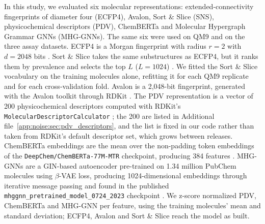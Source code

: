 In this study, we evaluated six molecular representations: extended-connectivity fingerprints of diameter four (ECFP4), Avalon, Sort \& Slice (SNS), physicochemical descriptors (PDV), ChemBERTa and Molecular Hypergraph Grammar GNNs (MHG-GNNs). The same six were used on QM9 and on the three assay datasets. ECFP4 is a Morgan fingerprint with radius $r = 2$ with $d = 2048$ bits \citep{rogers2010, rdkit}. Sort \& Slice takes the same substructures as ECFP4, but it ranks them by prevalence and selects the top $L$ ($L=1024$) \citep{sns}. We fitted the Sort \& Slice vocabulary on the training molecules alone, refitting it for each QM9 replicate and for each cross-validation fold.  Avalon is a 2,048-bit fingerprint, generated with the Avalon toolkit through RDKit \citep{avalon, rdkit}. The PDV representation is a vector of 200 physicochemical descriptors computed with RDKit's \texttt{MolecularDescriptorCalculator} \citep{rdkit, Cherkasov2014}; the 200 are listed in Additional file~\ref{app:noise:sec:pdv_descriptors}, and the list is fixed in our code rather than taken from RDKit's default descriptor set, which grows between releases. ChemBERTa embeddings are the mean over the non-padding token embeddings of the \texttt{DeepChem/ChemBERTa-77M-MTR} checkpoint, producing 384 features \citep{Ahmad2022}. MHG-GNNs are a GIN-based autoencoder pre-trained on 1.34 million PubChem molecules using $\beta$-VAE loss, producing 1024-dimensional embeddings through iterative message passing and found in the published \texttt{mhggnn\_pretrained\_model\_0724\_2023} checkpoint \citep{kishimoto2023}. We z-score normalized PDV, ChemBERTa and MHG-GNN per feature, using the training molecules' mean and standard deviation; ECFP4, Avalon and Sort \& Slice reach the model as built.

